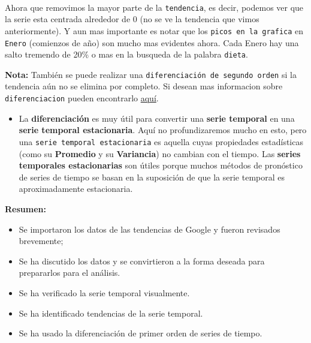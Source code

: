 \documentclass[11pt]{article}
\providecommand{\tightlist}{%
      \setlength{\itemsep}{0pt}\setlength{\parskip}{0pt}}
\begin{document}
    \begin{center}
    \end{center}
    { \hspace*{\fill} \\}
    
    Ahora que removimos la mayor parte de la \texttt{tendencia}, es decir,
podemos ver que la serie esta centrada alrededor de 0 (no se ve la
tendencia que vimos anteriormente). Y aun mas importante es notar que
los \texttt{picos\ en\ la\ grafica} en \texttt{Enero} (comienzos de año)
son mucho mas evidentes ahora. Cada Enero hay una salto tremendo de 20\%
o mas en la busqueda de la palabra \texttt{dieta}.

    \textbf{Nota:} También se puede realizar una
\texttt{diferenciación\ de\ segundo\ orden} si la tendencia aún no se
elimina por completo. Si desean mas informacion sobre
\texttt{diferenciacion} pueden encontrarlo
\href{https://www.otexts.org/fpp/8/1}{aquí}.

\begin{itemize}
\tightlist
\item
  La \textbf{diferenciación} es muy útil para convertir una
  \textbf{serie temporal} en una \textbf{serie temporal estacionaria}.
  Aquí no profundizaremos mucho en esto, pero una
  \texttt{serie\ temporal\ estacionaria} es aquella cuyas propiedades
  estadísticas (como su \textbf{Promedio} y su \textbf{Variancia}) no
  cambian con el tiempo. Las \textbf{series temporales estacionarias}
  son útiles porque muchos métodos de pronóstico de series de tiempo se
  basan en la suposición de que la serie temporal es aproximadamente
  estacionaria.
\end{itemize}

    \textbf{Resumen:}

\begin{itemize}
\tightlist
\item
  Se importaron los datos de las tendencias de Google y fueron revisados
  brevemente;
\item
  Se ha discutido los datos y se convirtieron a la forma deseada para
  prepararlos para el análisis.
\item
  Se ha verificado la serie temporal visualmente.
\item
  Se ha identificado tendencias de la serie temporal.
\item
  Se ha usado la diferenciación de primer orden de series de tiempo.
\end{itemize}
\end{document}

